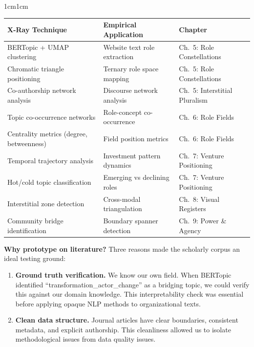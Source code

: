 \documentclass[../main.tex]{subfiles}
\begin{document}
\begin{adjustwidth}{1cm}{1cm}
\begin{center}
\small
\begin{tabular}{@{}p{3.5cm}p{4cm}p{4cm}@{}}
\toprule
\textbf{X-Ray Technique} & \textbf{Empirical Application} & \textbf{Chapter} \\
\midrule
BERTopic + UMAP clustering & Website text role extraction & Ch.~5: Role Constellations \\
\addlinespace
Chromatic triangle positioning & Ternary role space mapping & Ch.~5: Role Constellations \\
\addlinespace
Co-authorship network analysis & Discourse network analysis & Ch.~5: Interstitial Pluralism \\
\addlinespace
Topic co-occurrence networks & Role-concept co-occurrence & Ch.~6: Role Fields \\
\addlinespace
Centrality metrics (degree, betweenness) & Field position metrics & Ch.~6: Role Fields \\
\addlinespace
Temporal trajectory analysis & Investment pattern dynamics & Ch.~7: Venture Positioning \\
\addlinespace
Hot/cold topic classification & Emerging vs declining roles & Ch.~7: Venture Positioning \\
\addlinespace
Interstitial zone detection & Cross-modal triangulation & Ch.~8: Visual Registers \\
\addlinespace
Community bridge identification & Boundary spanner detection & Ch.~9: Power \& Agency \\
\bottomrule
\end{tabular}
\label{tab:xray-lineage}
\end{center}

\vspace{0.5cm}

\noindent\textbf{Why prototype on literature?} Three reasons made the scholarly corpus an ideal testing ground:

\begin{enumerate}[leftmargin=2em]
    \item \textbf{Ground truth verification.} We know our own field. When BERTopic identified ``transformation\_actor\_change'' as a bridging topic, we could verify this against our domain knowledge. This interpretability check was essential before applying opaque NLP methods to organizational texts.

    \item \textbf{Clean data structure.} Journal articles have clear boundaries, consistent metadata, and explicit authorship. This cleanliness allowed us to isolate methodological issues from data quality issues.


\end{enumerate}
\end{adjustwidth}
\end{document}

